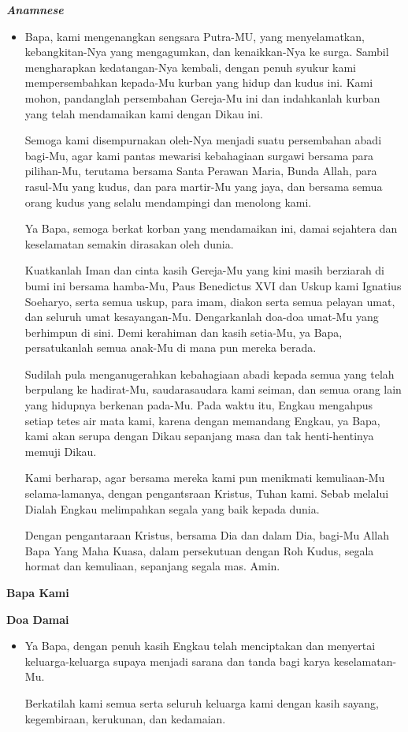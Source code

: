 \documentclass[10pt]{book}
\makeatletter
\newcommand{\subjudul}[1]{%
  {\parindent \z@ \normalfont
    \interlinepenalty\@M \bfseries #1\par\nobreak \vskip 20\p@ }}
\newcommand{\lagu}[1]{%
  {\parindent \z@ \normalfont
    \interlinepenalty\@M \bfseries \emph{#1}\par\nobreak \vskip 20\p@ }}
\newcommand{\BI}[1]{\begin{itemize} \item[I:] #1 \end{itemize}}
\makeatother
\begin{document}
\lagu{Anamnese}

\BI{Bapa, kami mengenangkan sengsara Putra-MU, yang menyelamatkan, kebangkitan-Nya yang mengagumkan, dan kenaikkan-Nya ke surga. Sambil mengharapkan kedatangan-Nya kembali, dengan penuh syukur kami mempersembahkan kepada-Mu kurban yang hidup dan kudus ini. Kami mohon, pandanglah persembahan Gereja-Mu ini dan indahkanlah kurban yang telah mendamaikan kami dengan Dikau ini.

Semoga kami disempurnakan oleh-Nya menjadi suatu persembahan abadi bagi-Mu, agar kami pantas mewarisi kebahagiaan surgawi bersama para pilihan-Mu, terutama bersama Santa Perawan Maria, Bunda Allah, para rasul-Mu yang kudus, dan para martir-Mu yang jaya, dan bersama semua orang kudus yang selalu mendampingi dan menolong kami.

Ya Bapa, semoga berkat korban yang mendamaikan ini, damai sejahtera dan keselamatan semakin dirasakan oleh dunia.

Kuatkanlah Iman dan cinta kasih Gereja-Mu yang kini masih berziarah di bumi ini bersama hamba-Mu, Paus Benedictus XVI dan Uskup kami Ignatius Soeharyo, serta semua uskup, para imam, diakon serta semua pelayan umat, dan seluruh umat kesayangan-Mu. Dengarkanlah doa-doa umat-Mu yang berhimpun di sini. Demi kerahiman dan kasih setia-Mu, ya Bapa, persatukanlah semua anak-Mu di mana pun mereka berada.

Sudilah pula menganugerahkan kebahagiaan abadi kepada semua yang telah berpulang ke hadirat-Mu, saudarasaudara kami seiman, dan semua orang lain yang hidupnya berkenan pada-Mu. Pada waktu itu, Engkau mengahpus setiap tetes air mata kami, karena dengan memandang Engkau, ya Bapa, kami akan serupa dengan Dikau sepanjang masa dan tak henti-hentinya memuji Dikau.

Kami berharap, agar bersama mereka kami pun menikmati kemuliaan-Mu selama-lamanya, dengan pengantsraan Kristus, Tuhan kami. Sebab melalui Dialah Engkau melimpahkan segala yang baik kepada dunia.

Dengan pengantaraan Kristus, bersama Dia dan dalam Dia, bagi-Mu Allah Bapa Yang Maha Kuasa, dalam persekutuan dengan Roh Kudus, segala hormat dan kemuliaan, sepanjang segala mas. Amin.}

\subjudul{Bapa Kami}

\subjudul{Doa Damai}

\BI{Ya Bapa, dengan penuh kasih Engkau telah menciptakan dan menyertai keluarga-keluarga supaya menjadi sarana dan tanda bagi karya keselamatan-Mu.

Berkatilah kami semua serta seluruh keluarga kami dengan kasih sayang, kegembiraan, kerukunan, dan kedamaian.}
\end{document}
